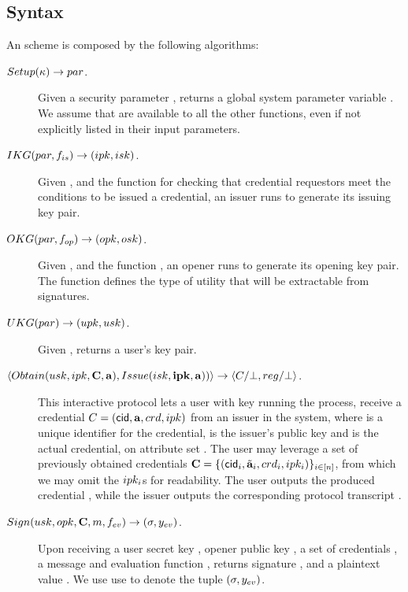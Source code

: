 \subsection{Syntax}
\label{ssec:syntax-uas}

An \UAS scheme is composed by the following algorithms:

\begin{description}
\item[$Setup(\kappa) \rightarrow par$.] Given a security parameter \secpar,
  returns a global system parameter variable \parm. We assume that \parm are
  available to all the other functions, even if not explicitly listed in their
  input parameters.
\item[$IKG(par,f_{is}) \rightarrow (ipk,isk)$.] Given \parm, and the
  function \fissue for checking that credential requestors meet the conditions
  to be issued a credential, an issuer runs \IKeyGen to generate its issuing key
  pair. 
\item[$OKG(par,f_{op}) \rightarrow (opk,osk)$.] Given \parm, and the
  function \finsp, an opener runs \OKeyGen to generate its opening key pair.
  The function \finsp defines the type of utility that will be extractable from
  signatures.
\item[$UKG(par) \rightarrow (upk,usk)$.] Given \parm, returns a user's
  key pair.
\item[$\langle
  Obtain(usk,ipk,\mathbf{C},\mathbf{a}),
  Issue(isk,\mathbf{ipk},\mathbf{a}))  
  \rangle \rightarrow \langle C/\bot,reg/\bot
  \rangle$.] %
  This interactive protocol lets a user with key \usk running the \Obtain
  process, receive a credential $C=(\mathsf{cid},\mathbf{a},crd,ipk)$ from an
  issuer in the system, where \cid is a unique identifier for the credential,
  \ipk is the issuer's public key and \cred is the actual credential, on
  attribute set \attrs. The user may leverage a set of previously obtained
  credentials $\mathbf{C}=\lbrace (\mathsf{cid}_i,\tilde{\mathbf{a}}_i,crd_i,ipk_i)
  \rbrace_{i\in[n]}$, from which we may omit the $ipk_i$s for readability. The
  user outputs the produced credential \Cred, while the issuer outputs the
  corresponding protocol transcript \utrans.
\item[$Sign(usk,opk,\mathbf{C},m,f_{ev}) \rightarrow (\sigma,y_{ev})$.] %
  Upon receiving a user secret key \usk, opener public key \opk, a set of
  credentials \sCred, a message \msg and evaluation function \feval, returns
  signature \sig, and a plaintext value \yeval. We use use \Sig to denote the
  tuple $(\sigma,y_{ev})$.

\end{description}
